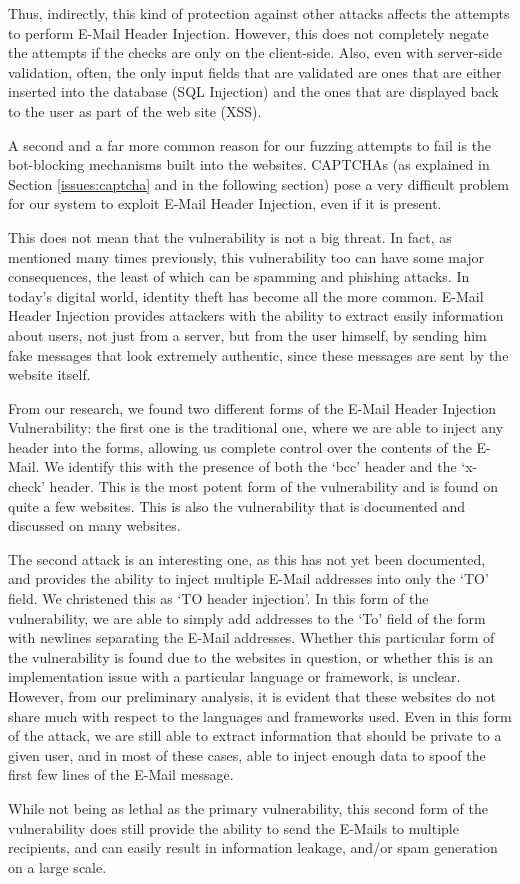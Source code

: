     Thus, indirectly, this kind of protection against other attacks affects the attempts to perform E-Mail Header Injection. However, this does not completely negate the attempts if the checks are only on the client-side. Also, even with server-side validation, often, the only input fields that are validated are ones that are either inserted into the database (SQL Injection) and the ones that are displayed back to the user as part of the web site (XSS).

	A second and a far more common reason for our fuzzing attempts to fail is the bot-blocking mechanisms built into the websites. CAPTCHAs (as explained in Section \ref{issues:captcha} and in the following section) pose a very difficult problem for our system to exploit E-Mail Header Injection, even if it is present.

	This does not mean that the vulnerability is not a big threat. In fact,
    as mentioned many times previously, this vulnerability too can have some major consequences, the least of which can be spamming and phishing attacks. In today's digital world, identity theft has become all the more common. E-Mail Header Injection provides attackers with the ability to extract easily information about users, not just from a server, but from the user himself, by sending him fake messages that look extremely authentic, since these messages are sent by the website itself.
    
    From our research, we found two different forms of the E-Mail Header Injection Vulnerability: the first one is the traditional one, where we are able to inject any header into the forms, allowing us complete control over the contents of the E-Mail. We identify this with the presence of both the `bcc' header and the `x-check' header. This is the most potent form of the vulnerability and is found on quite a few websites. This is also the vulnerability that is documented and discussed on many websites.
    
    The second attack is an interesting one, as this has not yet been documented, and provides the ability to inject multiple E-Mail addresses into only the `TO' field. We christened this as `TO header injection'. In this form of the vulnerability, we are able to simply add addresses to the `To' field of the form with newlines separating the E-Mail addresses. Whether this particular form of the vulnerability is found due to the websites in question, or whether this is an implementation issue with a particular language or framework, is unclear. However, from our preliminary analysis, it is evident that these websites do not share much with respect to the languages and frameworks used. 
    Even in this form of the attack, we are still able to extract information that should be private to a given user, and in most of these cases, able to inject enough data to spoof the first few lines of the E-Mail message.
    
    While not being as lethal as the primary vulnerability, this second form of the vulnerability does still provide the ability to send the E-Mails to multiple recipients, and can easily result in information leakage, and/or spam generation on a large scale.
    
